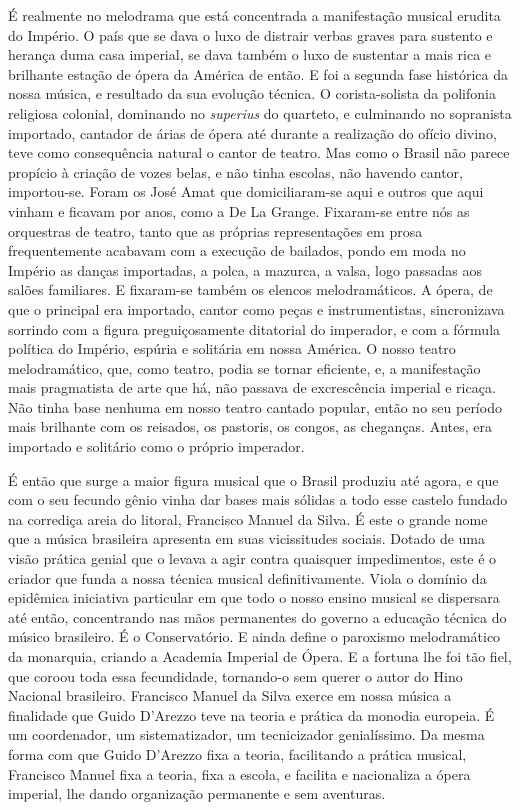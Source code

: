 É realmente no melodrama que está concentrada a manifestação musical
erudita do Império. O país que se dava o luxo de distrair verbas graves
para sustento e herança duma casa imperial, se dava também o luxo de
sustentar a mais rica e brilhante estação de ópera da América de então.
E foi a segunda fase histórica da nossa música, e resultado da sua
evolução técnica. O corista-solista da polifonia religiosa colonial,
dominando no \textit{superius} do quarteto, e culminando no sopranista importado,
cantador de árias de ópera até durante a realização do ofício divino,
teve como consequência natural o cantor de teatro. Mas como o Brasil não
parece propício à criação de vozes belas, e não tinha escolas, não
havendo cantor, importou-se. Foram os José Amat que domiciliaram-se aqui
e outros que aqui vinham e ficavam por anos, como a De La Grange.
Fixaram-se entre nós as orquestras de teatro, tanto que as próprias
representações em prosa frequentemente acabavam com a execução de
bailados, pondo em moda no Império as danças importadas, a polca, a
mazurca, a valsa, logo passadas aos salões familiares. E fixaram-se
também os elencos melodramáticos. A ópera, de que o principal era
importado, cantor como peças e instrumentistas, sincronizava sorrindo
com a figura preguiçosamente ditatorial do imperador, e com a fórmula
política do Império, espúria e solitária em nossa América. O nosso
teatro melodramático, que, como teatro, podia se tornar eficiente, e, a
manifestação mais pragmatista de arte que há, não passava de
excrescência imperial e ricaça. Não tinha base nenhuma em nosso teatro
cantado popular, então no seu período mais brilhante com os reisados, os
pastoris, os congos, as cheganças. Antes, era importado e solitário como
o próprio imperador.

É então que surge a maior figura musical que o Brasil produziu até
agora, e que com o seu fecundo gênio vinha dar bases mais sólidas a todo
esse castelo fundado na corrediça areia do litoral, Francisco Manuel da
Silva. É este o grande nome que a música brasileira apresenta em suas
vicissitudes sociais. Dotado de uma visão prática genial que o levava a
agir contra quaisquer impedimentos, este é o criador que funda a nossa
técnica musical definitivamente. Viola o domínio da epidêmica iniciativa
particular em que todo o nosso ensino musical se dispersara até então,
concentrando nas mãos permanentes do governo a educação técnica do
músico brasileiro. É o Conservatório. E ainda define o paroxismo
melodramático da monarquia, criando a Academia Imperial de Ópera. E a
fortuna lhe foi tão fiel, que coroou toda essa fecundidade, tornando-o
sem querer o autor do Hino Nacional brasileiro. Francisco Manuel da
Silva exerce em nossa música a finalidade que Guido D'Arezzo teve na
teoria e prática da monodia europeia. É um coordenador, um
sistematizador, um tecnicizador genialíssimo. Da mesma forma com que
Guido D'Arezzo fixa a teoria, facilitando a prática musical, Francisco
Manuel fixa a teoria, fixa a escola, e facilita e nacionaliza a ópera
imperial, lhe dando organização permanente e sem aventuras.

